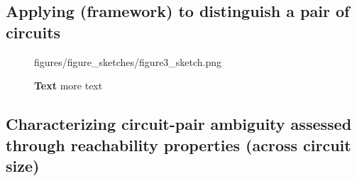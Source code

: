 \subsection{Applying (framework) to distinguish a pair of circuits}

\begin{figure}[ht]
	\centering
	 \begin{overpic}[width=.6\textwidth]{figures/figure_sketches/figure3_sketch.png}
	  \end{overpic}
    \caption{\textbf{Text} more text}
    \label{fig:case_study} %
 \end{figure}


\subsection{Characterizing circuit-pair ambiguity assessed through reachability properties (across circuit size) }
